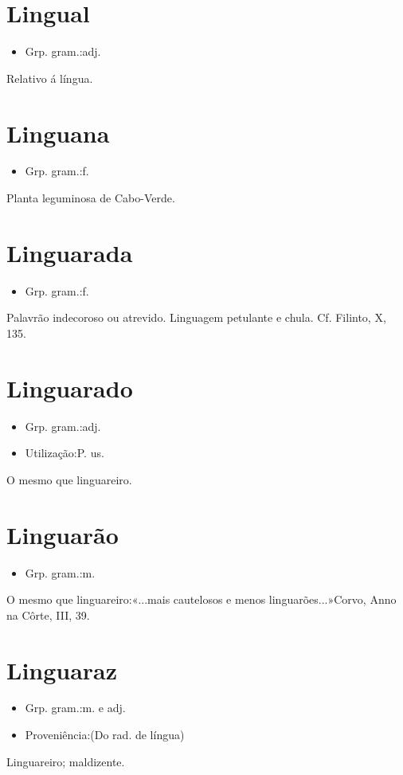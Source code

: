 \section{Lingual}
\begin{itemize}
\item {Grp. gram.:adj.}
\end{itemize}
Relativo á língua.
\section{Linguana}
\begin{itemize}
\item {Grp. gram.:f.}
\end{itemize}
Planta leguminosa de Cabo-Verde.
\section{Linguarada}
\begin{itemize}
\item {Grp. gram.:f.}
\end{itemize}
Palavrão indecoroso ou atrevido.
Linguagem petulante e chula. Cf. Filinto, X, 135.
\section{Linguarado}
\begin{itemize}
\item {Grp. gram.:adj.}
\end{itemize}
\begin{itemize}
\item {Utilização:P. us.}
\end{itemize}
O mesmo que \textunderscore linguareiro\textunderscore .
\section{Linguarão}
\begin{itemize}
\item {Grp. gram.:m.}
\end{itemize}
O mesmo que \textunderscore linguareiro\textunderscore :«\textunderscore ...mais cautelosos e menos linguarões...\textunderscore »Corvo, \textunderscore Anno na Côrte\textunderscore , III, 39.
\section{Linguaraz}
\begin{itemize}
\item {Grp. gram.:m.  e  adj.}
\end{itemize}
\begin{itemize}
\item {Proveniência:(Do rad. de \textunderscore língua\textunderscore )}
\end{itemize}
Linguareiro; maldizente.
